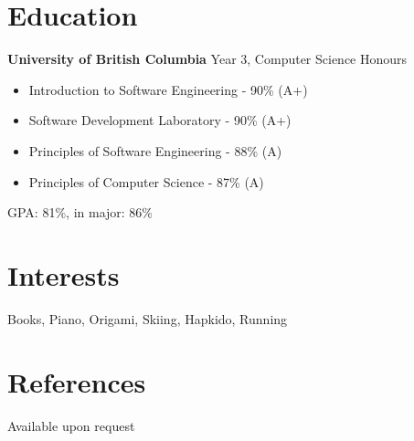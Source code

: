 \documentclass[11pt,margin,centered]{res}
\begin{document}
\section{Education} 
{\bf University of British Columbia} \hfill Year 3, Computer Science
Honours
\begin{itemize} \itemsep -1pt
    \item Introduction to Software Engineering - 90\% (A+)
    \item Software Development Laboratory - 90\% (A+)
    \item Principles of Software Engineering - 88\% (A)
    \item Principles of Computer Science - 87\% (A)

\end{itemize}
GPA: 81\%, in major: 86\% \\


\section{Interests}
Books, Piano, Origami, Skiing, Hapkido, Running

\section{References}
Available upon request
\end{document}
